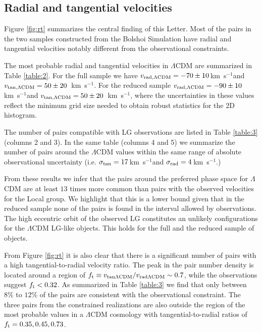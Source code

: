 \documentclass{emulateapj}
\newcommand{\kms}{\,km~s$^{-1}$}
\begin{document}
\subsection{Radial and tangential velocities}

Figure \ref{fig:rt} summarizes the central finding of this
Letter. Most of the pairs in the two samples constructed from the
Bolshoi Simulation have radial and tangential velocities notably
different from the observational constraints.   

The most probable radial and tangential velocities in $\Lambda$CDM are
summarized in Table \ref{table:2}. For the full sample we have $v_{\rm
  rad,\Lambda CDM} = -70\pm10$\kms and $v_{\rm tan,\Lambda CDM} =
50\pm20$ \kms. For the reduced sample $v_{\rm
  rad,\Lambda CDM} = -90\pm10$\kms and $v_{\rm tan,\Lambda CDM} =
50\pm20$ \kms, where the uncertainties in these values reflect
the minimum grid size needed to obtain robust statistics for the 2D
histogram. 

The number of pairs compatible with LG observations are listed in
Table \ref{table:3} (columns 2 and 3). In the same table (columns 4
and 5) we summarize the number of pairs around the $\Lambda$CDM values
within the same range of absolute observational uncertainty
(i.e. $\sigma_{\rm tan}=17$\kms and $\sigma_{\rm rad}=4$\kms.) 

From these results we infer that the pairs around the preferred phase
space for $\Lambda$CDM are at least $13$ times more common than pairs
with the observed velocities for the Local group. We highlight that
this is a lower bound given that in the reduced sample none of the
pairs is found in the interval allowed by observations. The high
eccentric orbit of the observed LG  constitutes an unlikely
configurations for the $\Lambda$CDM LG-like objects. This holds for
the full and the reduced sample of objects. 


From Figure \ref{fig:rt} it is also clear that there is a significant
number of pairs with a high tangential-to-radial velocity ratio. The
peak in the pair number density is located around a region of $f_{\rm
  t}\equiv v_{\rm tan \Lambda CDM}/v_{\rm rad \Lambda CDM}\sim 0.7$,
while the observations suggest $f_{\rm t}<0.32$. As summarized in Table
\ref{table:3} we find that only between $8\%$ to $12\%$ of the pairs are
consistent with the observational constraint. The three
pairs from the constrained realizations are also outside the region of
the most probable values in a $\Lambda$CDM cosmology with
tangential-to-radial ratios of $f_{\rm t}= 0.35, 0.45, 0.73$. 
\end{document}
